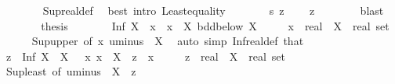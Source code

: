\begin{isabellebody}
\ \ \ \ \ \ \isamarkupfalse%
\ Sup{\isacharunderscore}{\kern0pt}real{\isacharunderscore}{\kern0pt}def\ \isamarkupfalse%
\ {\isacharparenleft}{\kern0pt}best\ intro{\isacharcolon}{\kern0pt}\ Least{\isacharunderscore}{\kern0pt}equality{\isacharparenright}{\kern0pt}\isanewline
\ \ \ \ \isamarkupfalse%
\ \isamarkupfalse%
\ s\ z\ \isamarkupfalse%
\ {\isachardoublequoteopen}{\isasymdots}\ {\isasymle}\ z{\isachardoublequoteclose}\isanewline
\ \ \ \ \ \ \isamarkupfalse%
\ blast\isanewline
\ \ \ \ \isamarkupfalse%
\ \isamarkupfalse%
\ {\isacharquery}{\kern0pt}thesis\ \isacommand{{\isachardot}{\kern0pt}}\isamarkupfalse%
\isanewline
\ \ \isamarkupfalse%
\isanewline
\ \ \isamarkupfalse%
\ {\isachardoublequoteopen}Inf\ X\ {\isasymle}\ x{\isachardoublequoteclose}\ \ {\isachardoublequoteopen}x\ {\isasymin}\ X{\isachardoublequoteclose}\ {\isachardoublequoteopen}bdd{\isacharunderscore}{\kern0pt}below\ X{\isachardoublequoteclose}\isanewline
\ \ \ \ \ x\ {\isacharcolon}{\kern0pt}{\isacharcolon}{\kern0pt}\ real\ \ X\ {\isacharcolon}{\kern0pt}{\isacharcolon}{\kern0pt}\ {\isachardoublequoteopen}real\ set{\isachardoublequoteclose}\isanewline
\ \ \ \ \isamarkupfalse%
\ Sup{\isacharunderscore}{\kern0pt}upper\ {\isacharbrackleft}{\kern0pt}of\ {\isachardoublequoteopen}{\isacharminus}{\kern0pt}x{\isachardoublequoteclose}\ {\isachardoublequoteopen}uminus\ {\isacharbackquote}{\kern0pt}\ X{\isachardoublequoteclose}{\isacharbrackright}{\kern0pt}\ \isamarkupfalse%
\ {\isacharparenleft}{\kern0pt}auto\ simp{\isacharcolon}{\kern0pt}\ Inf{\isacharunderscore}{\kern0pt}real{\isacharunderscore}{\kern0pt}def\ that{\isacharparenright}{\kern0pt}\isanewline
\ \ \isamarkupfalse%
\ {\isachardoublequoteopen}z\ {\isasymle}\ Inf\ X{\isachardoublequoteclose}\ \ {\isachardoublequoteopen}X\ {\isasymnoteq}\ {\isacharbraceleft}{\kern0pt}{\isacharbraceright}{\kern0pt}{\isachardoublequoteclose}\ {\isachardoublequoteopen}{\isasymAnd}x{\isachardot}{\kern0pt}\ x\ {\isasymin}\ X\ {\isasymLongrightarrow}\ z\ {\isasymle}\ x{\isachardoublequoteclose}\isanewline
\ \ \ \ \ z\ {\isacharcolon}{\kern0pt}{\isacharcolon}{\kern0pt}\ real\ \ X\ {\isacharcolon}{\kern0pt}{\isacharcolon}{\kern0pt}\ {\isachardoublequoteopen}real\ set{\isachardoublequoteclose}\isanewline
\ \ \ \ \isamarkupfalse%
\ Sup{\isacharunderscore}{\kern0pt}least\ {\isacharbrackleft}{\kern0pt}of\ {\isachardoublequoteopen}uminus\ {\isacharbackquote}{\kern0pt}\ X{\isachardoublequoteclose}\ {\isachardoublequoteopen}{\isacharminus}{\kern0pt}\ z{\isachardoublequoteclose}{\isacharbrackright}{\kern0pt}\ \isamarkupfalse%

\end{isabellebody}
